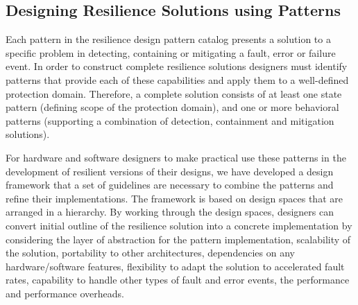 \subsection{Designing Resilience Solutions using Patterns}
Each pattern in the resilience design pattern catalog presents a solution to a specific problem in detecting, containing or mitigating a fault, error or failure event. In order to construct complete resilience solutions designers must identify patterns that provide each of these capabilities and apply them to a well-defined protection domain. Therefore, a complete solution consists of at least one state pattern (defining scope
of the protection domain), and one or more behavioral patterns (supporting a combination of
detection, containment and mitigation solutions).

For hardware and software designers to make practical use these patterns in the development of resilient versions of their designs, we have developed a design framework that a set of guidelines are necessary to combine the patterns and refine their implementations. The framework is based on design spaces that are arranged
in a hierarchy. By working through the design spaces, designers can convert initial outline of the resilience solution into a concrete implementation by considering the layer of abstraction for the pattern implementation, scalability of the solution, portability to other architectures, dependencies on any hardware/software features, flexibility to adapt the solution to accelerated fault rates, capability to handle other types of fault and error events, the performance and performance overheads. 

